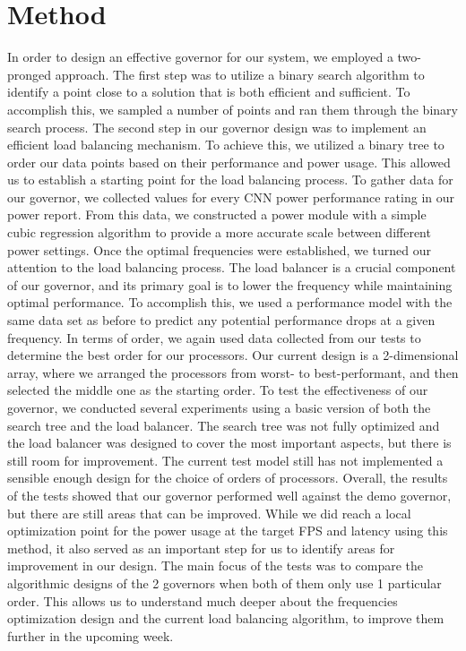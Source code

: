 \documentclass[a4paper, 12pt, fleqn]{article}
\begin{document}
\section{Method}
In order to design an effective governor for our system, we employed a two-pronged approach. The first step was to utilize a binary search algorithm to identify a point close to a solution that is both efficient and sufficient. To accomplish this, we sampled a number of points and ran them through the binary search process.
The second step in our governor design was to implement an efficient load balancing mechanism. To achieve this, we utilized a binary tree to order our data points based on their performance and power usage. This allowed us to establish a starting point for the load balancing process.
To gather data for our governor, we collected values for every CNN power performance rating in our power report. From this data, we constructed a power module with a simple cubic regression algorithm to provide a more accurate scale between different power settings.
Once the optimal frequencies were established, we turned our attention to the load balancing process. The load balancer is a crucial component of our governor, and its primary goal is to lower the frequency while maintaining optimal performance. To accomplish this, we used a performance model with the same data set as before to predict any potential performance drops at a given frequency.
In terms of order, we again used data collected from our tests to determine the best order for our processors. Our current design is a 2-dimensional array, where we arranged the processors from worst- to best-performant, and then selected the middle one as the starting order.
To test the effectiveness of our governor, we conducted several experiments using a basic version of both the search tree and the load balancer. The search tree was not fully optimized and the load balancer was designed to cover the most important aspects, but there is still room for improvement. The current test model still has not implemented a sensible enough design for the choice of orders of processors.
Overall, the results of the tests showed that our governor performed well against the demo governor, but there are still areas that can be improved. While we did reach a local optimization point for the power usage at the target FPS and latency using this method, it also served as an important step for us to identify areas for improvement in our design. The main focus of the tests was to compare the algorithmic designs of the 2 governors when both of them only use 1 particular order. This allows us to understand much deeper about the frequencies optimization design and the current load balancing algorithm, to improve them further in the upcoming week.
\end{document}
